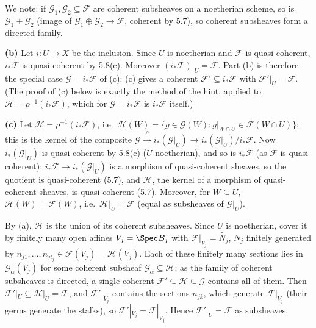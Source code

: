 \documentclass[11pt]{article}
\begin{document}
We note: if $\mathcal G_1,\mathcal G_2\subseteq\mathcal F$ are coherent subsheaves on a noetherian scheme, so is $\mathcal G_1+\mathcal G_2$ (image of $\mathcal G_1\oplus\mathcal G_2\to\mathcal F$, coherent by 5.7), so coherent subsheaves form a directed family.

\textbf{(b)} Let $i:U\to X$ be the inclusion. Since $U$ is noetherian and $\mathcal F$ is quasi-coherent, $i_*\mathcal F$ is quasi-coherent by 5.8(c). Moreover $(i_*\mathcal F)|_U=\mathcal F$. Part (b) is therefore the special case $\mathcal G=i_*\mathcal F$ of (c): (c) gives a coherent $\mathcal F'\subseteq i_*\mathcal F$ with $\mathcal F'|_U=\mathcal F$. (The proof of (c) below is exactly the method of the hint, applied to $\mathcal H=\rho^{-1}(i_*\mathcal F)$, which for $\mathcal G=i_*\mathcal F$ is $i_*\mathcal F$ itself.)

\textbf{(c)} Let $\mathcal H=\rho^{-1}(i_*\mathcal F)$, i.e.\ $\mathcal H(W)=\{g\in\mathcal G(W):g|_{W\cap U}\in\mathcal F(W\cap U)\}$; this is the kernel of the composite $\mathcal G\xrightarrow{\rho}i_*(\mathcal G|_U)\to i_*(\mathcal G|_U)/i_*\mathcal F$. Now $i_*(\mathcal G|_U)$ is quasi-coherent by 5.8(c) ($U$ noetherian), and so is $i_*\mathcal F$ (as $\mathcal F$ is quasi-coherent); $i_*\mathcal F\to i_*(\mathcal G|_U)$ is a morphism of quasi-coherent sheaves, so the quotient is quasi-coherent (5.7), and $\mathcal H$, the kernel of a morphism of quasi-coherent sheaves, is quasi-coherent (5.7). Moreover, for $W\subseteq U$, $\mathcal H(W)=\mathcal F(W)$, i.e.\ $\mathcal H|_U=\mathcal F$ (equal as subsheaves of $\mathcal G|_U$).

By (a), $\mathcal H$ is the union of its coherent subsheaves. Since $U$ is noetherian, cover it by finitely many open affines $V_j=\Spec B_j$ with $\mathcal F|_{V_j}=\widetilde{N_j}$, $N_j$ finitely generated by $n_{j1},\dots,n_{jt_j}\in\mathcal F(V_j)=\mathcal H(V_j)$. Each of these finitely many sections lies in $\mathcal G_\alpha(V_j)$ for some coherent subsheaf $\mathcal G_\alpha\subseteq\mathcal H$; as the family of coherent subsheaves is directed, a single coherent $\mathcal F'\subseteq\mathcal H\subseteq\mathcal G$ contains all of them. Then $\mathcal F'|_U\subseteq\mathcal H|_U=\mathcal F$, and $\mathcal F'|_{V_j}$ contains the sections $n_{jk}$, which generate $\mathcal F|_{V_j}$ (their germs generate the stalks), so $\mathcal F'|_{V_j}=\mathcal F|_{V_j}$. Hence $\mathcal F'|_U=\mathcal F$ as subsheaves.
\end{document}
